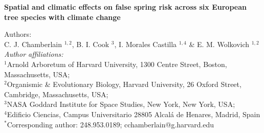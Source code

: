 \documentclass{article}\usepackage[]{graphicx}\usepackage[]{color}
\begin{document}
\noindent \textbf{\Large{Spatial and climatic effects on false spring risk across six European tree species with climate change}}

\noindent Authors:\\
C. J. Chamberlain $^{1,2}$, B. I. Cook $^{3}$, I. Morales Castilla $^{1,4}$ \& E. M. Wolkovich $^{1,2}$
\vspace{2ex}\\
\emph{Author affiliations:}\\
$^{1}$Arnold Arboretum of Harvard University, 1300 Centre Street, Boston, Massachusetts, USA; \\
$^{2}$Organismic \& Evolutionary Biology, Harvard University, 26 Oxford Street, Cambridge, Massachusetts, USA; \\
$^{3}$NASA Goddard Institute for Space Studies, New York, New York, USA; \\
$^{4}$Edificio Ciencias, Campus Universitario 28805 Alcalá de Henares, Madrid, Spain \\
\vspace{2ex}
$^*$Corresponding author: 248.953.0189; cchamberlain@g.harvard.edu\\

\renewcommand{\thetable}{\arabic{table}}
\renewcommand{\thefigure}{\arabic{figure}}
\renewcommand{\labelitemi}{$-$}


\end{document}
